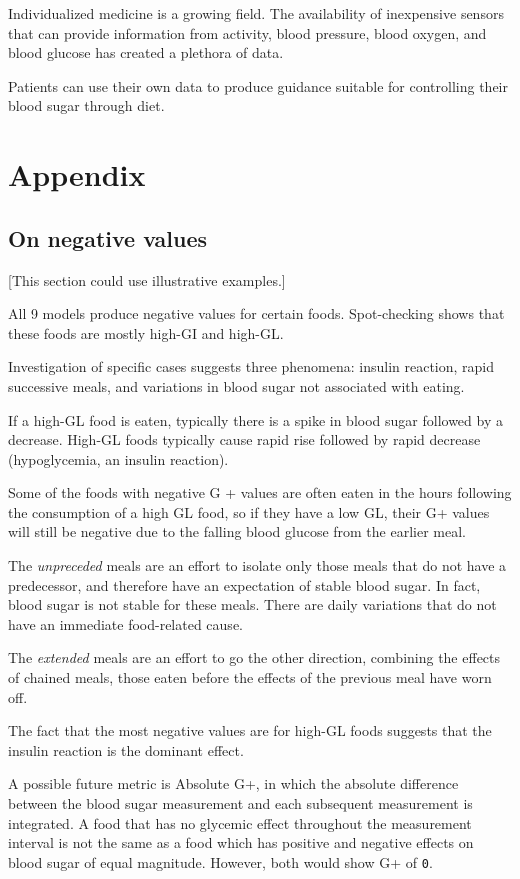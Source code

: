 \documentclass[conference]{IEEEtran}
\begin{document}
Individualized medicine is a growing field. The availability of inexpensive sensors that can provide information from activity, blood pressure, blood oxygen, and blood glucose has created a plethora of data.

Patients can use their own data to produce guidance suitable for controlling their blood sugar through diet.

\section*{Appendix}

\subsection{On negative values}

[This section could use illustrative examples.]

All 9 models produce negative values for certain foods. Spot-checking shows that these foods are mostly high-GI and high-GL.

Investigation of specific cases suggests three phenomena: insulin reaction, rapid successive meals, and variations in blood sugar not associated with eating.

If a high-GL food is eaten, typically there is a spike in blood sugar followed by a decrease. High-GL foods typically cause rapid rise followed by rapid decrease (hypoglycemia, an insulin reaction).

Some of the foods with negative G + values are often eaten in the hours following the consumption of a high GL food, so if they have a low GL, their G+ values will still be negative due to the falling blood glucose from the earlier meal.

The \emph{unpreceded} meals are an effort to isolate only those meals that do not have a predecessor, and therefore have an expectation of stable blood sugar. In fact, blood sugar is not stable for these meals. There are daily variations that do not have an immediate food-related cause.

The \emph{extended} meals are an effort to go the other direction, combining the effects of chained meals, those eaten before the effects of the previous meal have worn off.

The fact that the most negative values are for high-GL foods suggests that the insulin reaction is the dominant effect.

A possible future metric is Absolute G+, in which the absolute difference between the blood sugar measurement and each subsequent measurement is integrated. A food that has no glycemic effect throughout the measurement interval is not the same as a food which has positive and negative effects on blood sugar of equal magnitude. However, both would show G+ of \texttt{0}.
\end{document}
